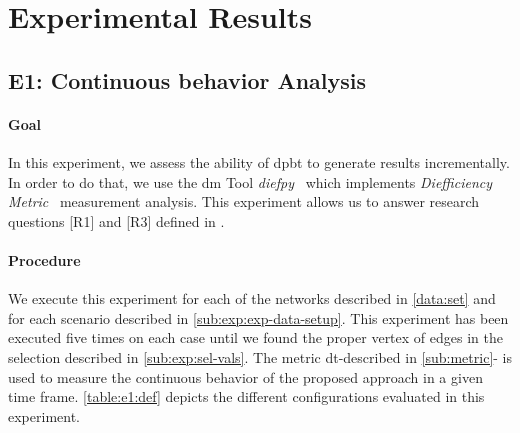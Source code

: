 \section{Experimental Results}\label{sec:exp:observed-results}
\subsection{E1: Continuous behavior Analysis}\label{sub:sec:exp-1} 
\paragraph{Goal} In this experiment, we assess the ability of \acrshort{dpbt} to generate results incrementally.
In order to do that, we use the \acrfull{dm} Tool \emph{diefpy}~\cite{diefpy} which implements \emph{Diefficiency Metric}~\cite{diefpaper} measurement analysis.
This experiment allows us to answer research questions [R1] and [R3] defined in . 

\paragraph{Procedure} We execute this experiment for each of the networks described in \autoref{data:set} and for each scenario described in \autoref{sub:exp:exp-data-setup}.
This experiment has been executed five times on each case until we found the proper vertex of edges in the selection described in \autoref{sub:exp:sel-vals}.
The metric  \acrfull{dt}-described in \autoref{sub:metric}- is used to measure the continuous behavior of the proposed approach in a given time frame.
\autoref{table:e1:def} depicts the different configurations evaluated in this experiment.

